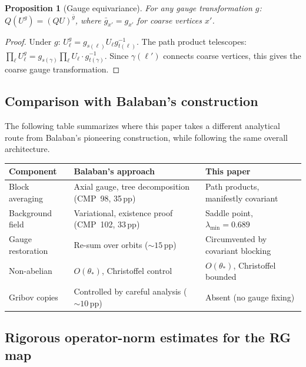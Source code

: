 \documentclass[11pt]{article}
\newtheorem{proposition}[theorem]{Proposition}
\theoremstyle{definition}
\begin{document}
\begin{proposition}[Gauge equivariance]\label{prop:equiv}
For any gauge transformation $g$:
$Q(U^g)=(QU)^{\bar{g}}$, where $\bar{g}_{x'}=g_{x'}$ for coarse
vertices $x'$.
\end{proposition}

\begin{proof}
Under $g$: $U_\ell^g=g_{s(\ell)}U_\ell g_{t(\ell)}^{-1}$.  The
path product telescopes:
$\prod_\ell U_\ell^g=g_{s(\gamma)}\prod_\ell U_\ell\cdot g_{t(\gamma)}^{-1}$.
Since $\gamma(\ell')$ connects coarse vertices, this gives the
coarse gauge transformation.
\end{proof}

\subsection{Comparison with Balaban's construction}

The following table summarizes where this paper takes a different
analytical route from Balaban's pioneering construction, while
following the same overall architecture.

\begin{center}
\begin{tabular}{p{3cm}p{5cm}p{5cm}}
\toprule
\textbf{Component} & \textbf{Balaban's approach} & \textbf{This paper}\\
\midrule
Block averaging & Axial gauge, tree
decomposition~\cite{BalabanAvg,BalabanVar} (CMP~98, 35\,pp) &
Path products, manifestly covariant\\
Background field & Variational, existence proof (CMP~102, 33\,pp) &
Saddle point, $\lambda_{\min}=0.689$\\
Gauge restoration & Re-sum over orbits (${\sim}15$\,pp) &
Circumvented by covariant blocking\\
Non-abelian & $O(\theta_*)$, Christoffel control &
$O(\theta_*)$, Christoffel bounded\\
Gribov copies & Controlled by careful analysis (${\sim}10$\,pp) & Absent (no gauge fixing)\\
\bottomrule
\end{tabular}
\end{center}

\subsection{Rigorous operator-norm estimates for the RG map}%
\label{subsec:rig-estimates}
\end{document}
